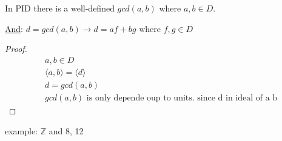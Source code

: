 \documentclass{article}
\begin{document}
 In PID there is a well-defined $gcd(a,b)$ where $a,b \in D$. 

 \underline{And}: $d = gcd(a,b) \rightarrow d = af + bg \text{ where } f,g \in D$  \\ 

 \begin{proof}
    \begin{align*}
        &a, b \in D \\ 
        &\langle a, b \rangle = \langle d \rangle  \\ 
        & d = gcd(a, b) \\ 
        & gcd(a,b) \text{ is only depende oup to units.  since d in ideal of a b}
    \end{align*}
 \end{proof}
 example: $\mathbb{Z} $ and 8, 12

 
\end{document}
